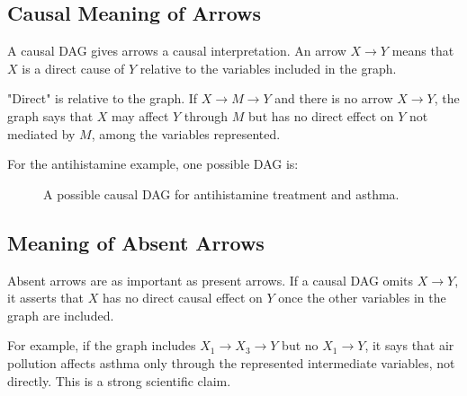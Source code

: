 \subsection{Causal Meaning of Arrows}

A causal DAG gives arrows a causal interpretation. An arrow $X\to Y$ means that $X$ is a direct cause of $Y$ relative to the variables included in the graph.

"Direct" is relative to the graph. If $X\to M\to Y$ and there is no arrow $X\to Y$, the graph says that $X$ may affect $Y$ through $M$ but has no direct effect on $Y$ not mediated by $M$, among the variables represented.

For the antihistamine example, one possible DAG is:

\begin{figure}[H]
\centering
{}
\caption{A possible causal DAG for antihistamine treatment and asthma.}
\end{figure}

\subsection{Meaning of Absent Arrows}

Absent arrows are as important as present arrows. If a causal DAG omits $X\to Y$, it asserts that $X$ has no direct causal effect on $Y$ once the other variables in the graph are included.

For example, if the graph includes $X_1\to X_3\to Y$ but no $X_1\to Y$, it says that air pollution affects asthma only through the represented intermediate variables, not directly. This is a strong scientific claim.

